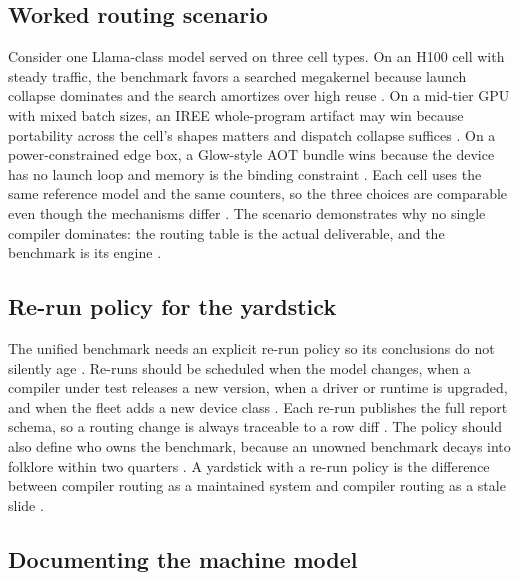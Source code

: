 \subsection{Worked routing scenario}

Consider one Llama-class model served on three cell types. On an H100 cell with steady traffic, the benchmark favors a searched megakernel because launch collapse dominates and the search amortizes over high reuse \citep{wu2024mirage,mpk2025,taxbreak2026}. On a mid-tier GPU with mixed batch sizes, an IREE whole-program artifact may win because portability across the cell's shapes matters and dispatch collapse suffices \citep{iree2024,memoryfloor2026}. On a power-constrained edge box, a Glow-style AOT bundle wins because the device has no launch loop and memory is the binding constraint \citep{rotem2018glow,amd2024aie}. Each cell uses the same reference model and the same counters, so the three choices are comparable even though the mechanisms differ \citep{patel2025llminference,memoryfloor2026}. The scenario demonstrates why no single compiler dominates: the routing table is the actual deliverable, and the benchmark is its engine \citep{yirage2026,taxbreak2026}.

\subsection{Re-run policy for the yardstick}

The unified benchmark needs an explicit re-run policy so its conclusions do not silently age \citep{patel2025llminference,memoryfloor2026}. Re-runs should be scheduled when the model changes, when a compiler under test releases a new version, when a driver or runtime is upgraded, and when the fleet adds a new device class \citep{taxbreak2026,chen2020compilerbasedhardw}. Each re-run publishes the full report schema, so a routing change is always traceable to a row diff \citep{patel2025llminference,memoryfloor2026}. The policy should also define who owns the benchmark, because an unowned benchmark decays into folklore within two quarters \citep{chen2020compilerbasedhardw,taxbreak2026}. A yardstick with a re-run policy is the difference between compiler routing as a maintained system and compiler routing as a stale slide \citep{patel2025llminference,memoryfloor2026}.

\subsection{Documenting the machine model}

